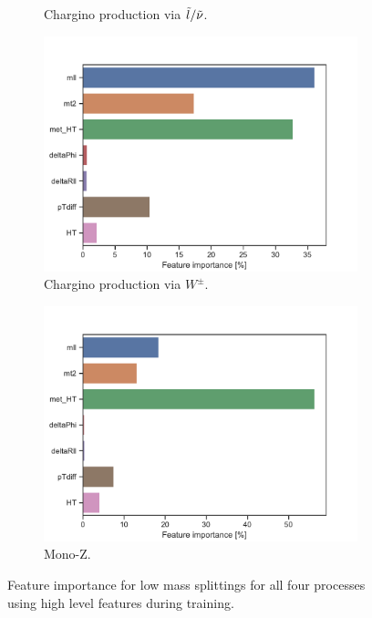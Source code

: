 \begin{figure}[H]
\begin{subfigure}[t!]{0.49\textwidth}
        \caption{Chargino production via $\Tilde{l}/\Tilde{\nu}$.}
        \label{fig:}
    \end{subfigure}
    \begin{subfigure}[t!]{0.49\textwidth}
        \includegraphics[width = \textwidth]{Figures/WW/BDT/High_level/High/featureImportance.pdf}
        \caption{Chargino production via $W^\pm$.}
        \label{fig:}
    \end{subfigure}
    \begin{subfigure}[t!]{0.49\textwidth}
        \includegraphics[width = \textwidth]{Figures/Mono_Z/ML/BDT/High_level/High/featureImportance.pdf}
        \caption{Mono-Z.}
        \label{fig:}
    \end{subfigure}
    \caption{Feature importance for low mass splittings for all four processes using high level features during training.}
    \label{fig:Non}
\end{figure}



